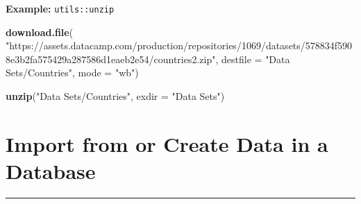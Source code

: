 \documentclass[
]{book}
\newenvironment{Shaded}{\begin{snugshade}}{\end{snugshade}}
\newcommand{\DataTypeTok}[1]{\textcolor[rgb]{0.13,0.29,0.53}{#1}}
\newcommand{\KeywordTok}[1]{\textcolor[rgb]{0.13,0.29,0.53}{\textbf{#1}}}
\newcommand{\NormalTok}[1]{#1}
\newcommand{\StringTok}[1]{\textcolor[rgb]{0.31,0.60,0.02}{#1}}
\begin{document}
\textbf{Example:} \texttt{utils::unzip}

\begin{Shaded}
\begin{Highlighting}[]
\KeywordTok{download.file}\NormalTok{(}
  \StringTok{"https://assets.datacamp.com/production/repositories/1069/datasets/578834f5908e3b2fa575429a287586d1eaeb2e54/countries2.zip"}\NormalTok{,}
  \DataTypeTok{destfile =} \StringTok{"Data Sets/Countries"}\NormalTok{,}
  \DataTypeTok{mode =} \StringTok{"wb"}\NormalTok{)}

\KeywordTok{unzip}\NormalTok{(}\StringTok{"Data Sets/Countries"}\NormalTok{, }\DataTypeTok{exdir =} \StringTok{"Data Sets"}\NormalTok{)}
\end{Highlighting}
\end{Shaded}

\hypertarget{import-from-or-create-data-in-a-database}{%
\section{Import from or Create Data in a Database}\label{import-from-or-create-data-in-a-database}}

\begin{center}\rule{0.5\linewidth}{0.5pt}\end{center}
\end{document}
